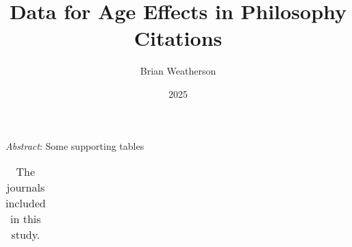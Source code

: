 \documentclass[
  11pt,
  letterpaper,
  DIV=11,
  numbers=noendperiod,
  twoside]{scrartcl}
\title{Data for Age Effects in Philosophy Citations}
\author{Brian Weatherson}
\date{2025}
\renewenvironment{abstract}
 {\vspace{-1.25cm}
 \quotation\small\noindent\emph{Abstract}:}
 {\endquotation}
\begin{document}
\maketitle
\begin{abstract}
Some supporting tables
\end{abstract}


\begin{longtable}[]{@{}
  >{\raggedright\arraybackslash}p{}
  >{\raggedleft\arraybackslash}p{}
  >{\raggedleft\arraybackslash}p{}
  >{\raggedleft\arraybackslash}p{}@{}}

\caption{\label{tbl-list-of-journals}The journals included in this
study.}

\tabularnewline


\end{longtable}
\end{document}
